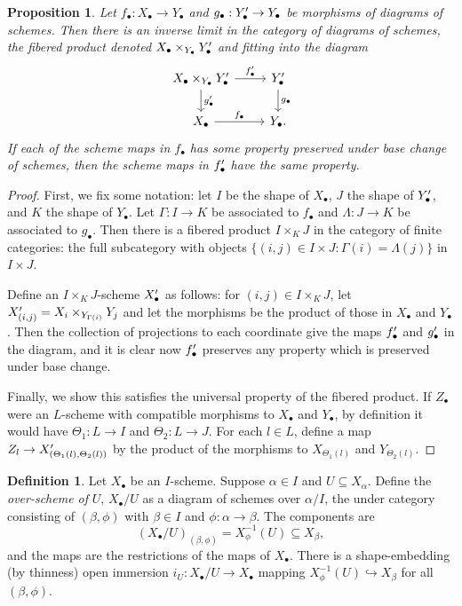 \documentclass{report}
\newtheorem{prop}[theorem]{Proposition}
\theoremstyle{definition}
\newtheorem{definition}[theorem]{Definition}
\begin{document}
\begin{prop}
	\label{thm:fiberedprod}
	Let $f_\bullet : X_\bullet \rightarrow Y_\bullet$ and $g_\bullet : Y_\bullet\rq{} \rightarrow Y_\bullet$ be morphisms of diagrams of schemes.
	Then there is an inverse limit in the category of diagrams of schemes, the fibered product denoted $X_\bullet \times_{Y_\bullet} Y_\bullet\rq{}$ and fitting into the diagram
	\[
	\begin{tikzcd}
	X_\bullet \times_{Y_\bullet} Y_\bullet\rq{} \arrow{r}{f_\bullet\rq{}} \arrow{d}{g_\bullet\rq{}} & Y_\bullet\rq{} \arrow{d}{g_\bullet} \\
	X_\bullet \arrow{r}{f_\bullet} & Y_\bullet.
	\end{tikzcd}
	\]
	If each of the scheme maps in $f_\bullet$ has some property preserved under base change of schemes, then the scheme maps in $f_\bullet\rq{}$ have the same property.
\end{prop}
\begin{proof}
	First, we fix some notation: let $I$ be the shape of $X_\bullet$, $J$ the shape of $Y_\bullet\rq{}$, and $K$ the shape of $Y_\bullet$.
	Let $\Gamma : I \rightarrow K$ be associated to $f_\bullet$ and $\Lambda : J \rightarrow K$ be associated to $g_\bullet$.
	Then there is a fibered product $I \times_K J$ in the category of finite categories: the full subcategory with objects $\{(i, j) \in I \times J : \Gamma(i) = \Lambda(j) \}$ in $I \times J$.
	
	Define an $I \times_K J$-scheme $X_\bullet\rq{}$ as follows: for $(i, j) \in I \times_K J$, let $X_{(i,j)}\rq{} = X_i \times_{Y_{\Gamma(i)}} Y_j$ and let the morphisms be the product of those in $X_\bullet$ and $Y_\bullet$.
	Then the collection of projections to each coordinate give the maps $f_\bullet\rq{}$ and $g_\bullet\rq{}$ in the diagram, and it is clear now $f_\bullet\rq{}$ preserves any property which is preserved under base change.
	
	Finally, we show this satisfies the universal property of the fibered product.
	If $Z_\bullet$ were an $L$-scheme with compatible morphisms to $X_\bullet$ and $Y_\bullet$, by definition it would have $\Theta_1 : L \rightarrow I$ and $\Theta_2 : L \rightarrow J$.
	For each $l \in L$, define a map $Z_l \rightarrow X_{(\Theta_1(l), \Theta_2(l))}\rq{}$ by the product of the morphisms to $X_{\Theta_1(l)}$ and $Y_{\Theta_2(l)}$.
\end{proof}

\begin{definition}
	Let $X_\bullet$ be an $I$-scheme.
	Suppose $\alpha \in I$ and $U \subseteq X_\alpha$.
	Define the {\it over-scheme of} $U$, $X_\bullet/U$ as a diagram of schemes over $\alpha/I$, the under category consisting of $(\beta, \phi)$ with $\beta \in I$ and $\phi : \alpha \rightarrow \beta$.
	The components are
	\[
	(X_\bullet/U)_{(\beta, \phi)} = X_\phi^{-1} (U) \subseteq X_\beta,
	\]
	and the maps are the restrictions of the maps of $X_\bullet$.
	There is a shape-embedding (by thinness) open immersion $i_U : X_\bullet / U \rightarrow X_\bullet$ mapping $X_\phi^{-1}(U) \hookrightarrow X_\beta$ for all $(\beta, \phi)$.
\end{definition}
\end{document}
